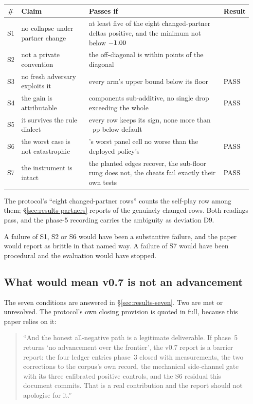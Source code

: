 \begin{center}\tabfont
\begin{tabularx}{\linewidth}{@{}l l L l@{}}
\toprule
\# & Claim & Passes if & Result \\
\midrule
S1 & no collapse under partner change & at least five of the eight changed-partner deltas positive,
and the minimum not below $-1.00{}$ & \vsevenSoneVerdict{} \\
S2 & not a private convention & the off-diagonal is within \vsevenStwoThreshold{} points of the diagonal & \vsevenStwoVerdict{} \\
S3 & no fresh adversary exploits it & every arm's upper bound below its floor & PASS \\
S4 & the gain is attributable & components sub-additive, no single drop exceeding the whole & PASS \\
S5 & it survives the rule dialect & every row keeps its sign, none more than \vsevenSfiveTolerance{}~pp below default & \vsevenSfiveVerdict{} \\
S6 & the worst case is not catastrophic & \sestina{}'s worst panel cell no worse than the deployed \vsix{} policy's & PASS \\
S7 & the instrument is intact & the planted edges recover, the sub-floor rung does not, the cheats fail exactly their own tests & PASS \\
\bottomrule
\end{tabularx}
\end{center}

The protocol's ``eight changed-partner rows'' counts the self-play row among them; \S\ref{sec:results-partners}
reports \vsevenSonePositive{} of the \vsevenSoneRows{} genuinely changed rows. Both readings pass, and
the phase-5 recording carries the ambiguity as deviation D9.

A failure of S1, S2 or S6 would have been a substantive failure, and the paper would report
\sestina{} as brittle in that named way. A failure of S7 would have been procedural and the evaluation would have
stopped.

\subsection*{What would mean v0.7 is not an advancement}

The seven conditions are answered in \S\ref{sec:results-seven}. Two are met or unresolved. The
protocol's own closing provision is quoted in full, because this paper relies on it:

\begin{quote}\small
``And the honest all-negative path is a legitimate deliverable. If phase~5 returns `no advancement over
the frontier', the v0.7 report is a barrier report: the four ledger entries phase~3 closed with
measurements, the two corrections to the corpus's own record, the mechanical side-channel gate with its
three calibrated positive controls, and the S6 residual this document commits. That is a real
contribution and the report should not apologise for it.''
\end{quote}
